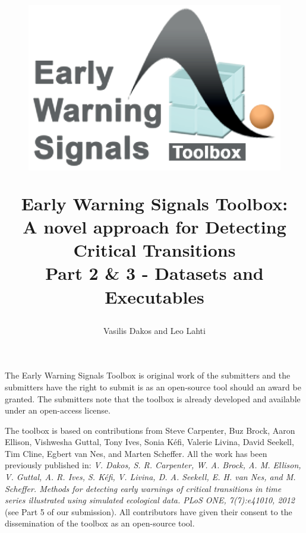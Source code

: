 \documentclass[12pt,a4paper,final]{article}
\author{Vasilis Dakos and Leo Lahti}
\title{
\begin{figure}[h]
\includegraphics[scale=0.55]{logoEWS.eps}
\end{figure}
Early Warning Signals Toolbox:\\ 
A novel approach for Detecting Critical Transitions\\
Part 2 \& 3 - Datasets and Executables
}
\begin{document}
\maketitle

\begin{doublespacing}

The Early Warning Signals Toolbox is original work of the submitters and the submitters have the right to submit is as an open-source tool should an award be granted. The submitters note that the toolbox is already developed and available under an open-access license.

The toolbox is based on contributions from Steve Carpenter, Buz Brock, Aaron Ellison, Vishwesha Guttal, Tony Ives, Sonia K\'{e}fi, Valerie Livina, David Seekell, Tim Cline, Egbert van Nes, and Marten Scheffer. All the work has been previously published in: \textit{V. Dakos, S. R. Carpenter, W. A. Brock, A. M. Ellison, V. Guttal, A. R. Ives, S. K\'{e}fi, V. Livina, D. A. Seekell, E. H. van Nes, and M. Scheffer. Methods for detecting early warnings of critical transitions in time series illustrated using simulated ecological data. PLoS ONE, 7(7):e41010, 2012} (see Part 5 of our submission).
All contributors have given their consent to the dissemination of the toolbox as an open-source tool.

\end{doublespacing}
\end{document}
